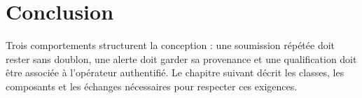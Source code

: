 \section{Conclusion}

Trois comportements structurent la conception : une soumission répétée doit
rester sans doublon, une alerte doit garder sa provenance et une qualification
doit être associée à l'opérateur authentifié. Le chapitre suivant décrit les
classes, les composants et les échanges nécessaires pour respecter ces exigences.
